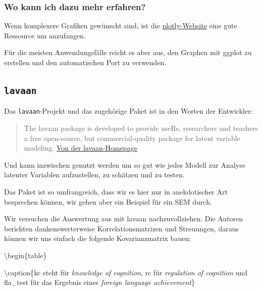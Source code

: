 \documentclass[
]{book}
\begin{document}
\hypertarget{htmlwidget-f0cc8fda8dcbdfe41688}{}

\hypertarget{wo-kann-ich-dazu-mehr-erfahren-3}{%
\subsubsection{Wo kann ich dazu mehr erfahren?}\label{wo-kann-ich-dazu-mehr-erfahren-3}}

Wenn komplexere Grafiken gewünscht sind, ist die \href{https://plotly.com/r/}{plotly-Website} eine gute Ressource um anzufangen.

Für die meisten Anwendungsfälle reicht es aber aus, den Graphen mit ggplot zu erstellen und den automatischen Port zu verwenden.

\hypertarget{lavaan}{%
\subsection{\texorpdfstring{\texttt{lavaan}}{lavaan}}\label{lavaan}}

Das \texttt{lavaan}-Projekt und das zugehörige Paket ist in den Worten der Entwickler:

\begin{quote}
The lavaan package is developed to provide useRs, researchers and teachers a free open-source, but commercial-quality package for latent variable modeling. \href{https://lavaan.ugent.be/index.html}{Von der lavaan-Homepage}
\end{quote}

Und kann inzwischen genutzt werden um so gut wie jedes Modell zur Analyse latenter Variablen aufzustellen, zu schätzen und zu testen.

Das Paket ist so umfrangreich, dass wir es hier nur in anekdotischer Art besprechen können, wir gehen aber ein Beispiel für ein SEM durch.

Wir versuchen die Auswertung aus \citet{pishghadamIntelligenceMetacognitionPredictors2013} mit lavaan nachzuvollziehen. Die Autoren berichten dankenswerterweise Korrelationsmatrizen und Streuungen, daraus können wir uns einfach die folgende Kovarianzmatrix bauen:

\textbackslash begin\{table\}

\textbackslash caption\{\label{tab:unnamed-chunk-134}kc steht für \emph{knowledge of cognition}, rc für \emph{regulation of cognition} und fla\_test für das Ergebnis eines \emph{foreign language achievement}\}
\centering
\end{document}
